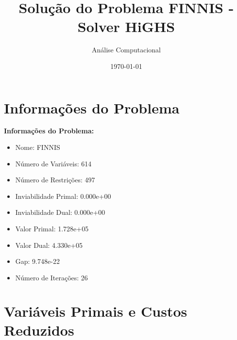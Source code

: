 \documentclass[12pt]{article}
\title{Solução do Problema FINNIS - Solver HiGHS}
\author{Análise Computacional}
\date{\today}
\begin{document}
\maketitle

\section{Informações do Problema}

\textbf{Informações do Problema:}
\begin{itemize}
\item Nome: FINNIS
\item Número de Variáveis: 614
\item Número de Restrições: 497
\item Inviabilidade Primal: 0.000e+00
\item Inviabilidade Dual: 0.000e+00
\item Valor Primal: 1.728e+05
\item Valor Dual: 4.330e+05
\item Gap: 9.748e-22
\item Número de Iterações: 26
\end{itemize}


\section{Variáveis Primais e Custos Reduzidos}
\end{document}
